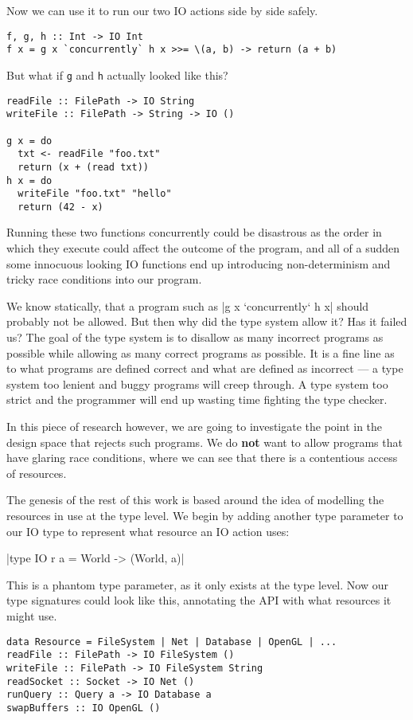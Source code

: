 \documentclass{report}
\begin{document}
Now we can use it to run our two IO actions side by side safely. 
\begin{verbatim}
f, g, h :: Int -> IO Int
f x = g x `concurrently` h x >>= \(a, b) -> return (a + b)
\end{verbatim}

But what if \texttt{g} and \texttt{h} actually looked like this?

\begin{verbatim}
readFile :: FilePath -> IO String
writeFile :: FilePath -> String -> IO ()

g x = do
  txt <- readFile "foo.txt"
  return (x + (read txt))
h x = do
  writeFile "foo.txt" "hello"
  return (42 - x)
\end{verbatim}

Running these two functions concurrently could be disastrous as the order in
which they execute could affect the outcome of the program, and all of a sudden
some innocuous looking IO functions end up introducing non-determinism and
tricky race conditions into our program.

We know statically, that a program such as |g x `concurrently` h
x| should probably not be allowed. But then why did the type system allow it?
Has it failed us? The goal of the type system is to disallow as many incorrect
programs as possible while allowing as many correct programs as possible. It is
a fine line as to what programs are defined correct and what are defined as
incorrect --- a type system too lenient and buggy programs will creep through. A
type system too strict and the programmer will end up wasting time fighting the
type checker.

In this piece of research however, we are going to investigate the point in the
design space that rejects such programs. We do \textbf{not} want to allow
programs that have glaring race conditions, where we can see that there is a
contentious access of resources.

The genesis of the rest of this work is based around the idea of modelling the
resources in use at the type level. We begin by adding another type parameter to
our IO type to represent what resource an IO action uses:

|type IO r a = World -> (World, a)|

This is a phantom type parameter, as it only exists at the type level. Now our
type signatures could look like this, annotating the API with what resources it
might use.

\begin{verbatim}
data Resource = FileSystem | Net | Database | OpenGL | ...
readFile :: FilePath -> IO FileSystem ()
writeFile :: FilePath -> IO FileSystem String
readSocket :: Socket -> IO Net ()
runQuery :: Query a -> IO Database a
swapBuffers :: IO OpenGL ()
\end{verbatim}
\end{document}
